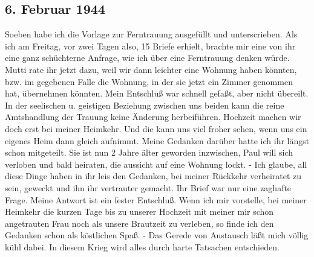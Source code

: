\subsection{6. Februar 1944}

Soeben habe ich die Vorlage zur Ferntrauung ausgef\"{u}llt und unterscrieben.
Als ich am Freitag, vor zwei Tagen also, 15 Briefe erhielt, brachte mir eine von ihr eine ganz sch\"{u}chterne Anfrage, wie ich \"{u}ber eine Ferntrauung denken w\"{u}rde.
Mutti rate ihr jetzt dazu, weil wir dann leichter eine Wohnung haben k\"{o}nnten, bzw. im gegebenen Falle die Wohnung, in der sie jetzt ein Zimmer genommen hat, \"{u}bernehmen k\"{o}nnten.
Mein Entschlu{\ss} war schnell gefa{\ss}t, aber nicht \"{u}bereilt.
In der seelischen u. geistigen Beziehung zwischen uns beiden kann die reine Amtshandlung der Trauung keine \"{A}nderung herbeif\"{u}hren.
Hochzeit machen wir doch erst bei meiner Heimkehr.
Und die kann uns viel froher sehen, wenn uns ein eigenes Heim dann gleich aufnimmt.
Meine Gedanken dar\"{u}ber hatte ich ihr l\"{a}ngst schon mitgeteilt.
Sie ist nun 2 Jahre \"{a}lter geworden inzwischen, Paul will sich verloben und bald heiraten, die aussicht auf eine Wohnung lockt.
- Ich glaube, all diese Dinge haben in ihr leis den Gedanken, bei meiner R\"{u}ckkehr verheiratet zu sein, geweckt und ihn ihr vertrauter gemacht.
Ihr Brief war nur eine zaghafte Frage.
Meine Antwort ist ein fester Entschlu{\ss}.
Wenn ich mir vorstelle, bei meiner Heimkehr die kurzen Tage bis zu unserer Hochzeit mit meiner mir schon angetrauten Frau noch als unsere Brautzeit zu verleben, so finde ich den Gedanken schon als k\"{o}stlichen Spa{\ss}.
- Das Gerede von Austausch l\"{a}{\ss}t mich v\"{o}llig k\"{u}hl dabei.
In diesem Krieg wird alles durch harte Tatsachen entschieden.

\clearpage
